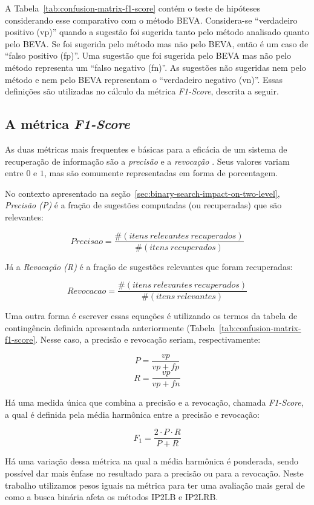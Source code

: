 A Tabela~\ref{tab:confusion-matrix-f1-score} contém o teste de hipóteses considerando esse comparativo com o método BEVA. Considera-se ``verdadeiro positivo (vp)'' quando a sugestão foi sugerida tanto pelo método analisado quanto pelo BEVA. Se foi sugerida pelo método mas não pelo BEVA, então é um caso de ``falso positivo (fp)''. Uma sugestão que foi sugerida pelo BEVA mas não pelo método representa um ``falso negativo (fn)''. As sugestões não sugeridas nem pelo método e nem pelo BEVA representam o ``verdadeiro negativo (vn)''. Essas definições são utilizadas no cálculo da métrica \textit{F1-Score}, descrita a seguir.


\subsection{A métrica \textit{F1-Score}}

As duas métricas mais frequentes e básicas para a eficácia de um sistema de recuperação de informação são a \textit{precisão} e a \textit{revocação}  \citep{irbookchristopher}. Seus valores variam entre $0$ e $1$, mas são comumente representadas em forma de porcentagem.

No contexto apresentado na seção~\ref{sec:binary-search-impact-on-two-level}, \textit{Precisão (P)} é a fração de sugestões computadas (ou recuperadas) que são relevantes:

$$ Precisao = \frac{\#(itens\ relevantes\ recuperados)}{\#(itens\ recuperados)}$$

Já a \textit{Revocação (R)} é a fração de sugestões relevantes que foram recuperadas:

$$ Revocacao = \frac{\#(itens\ relevantes\ recuperados)}{\#(itens\ relevantes)}$$

Uma outra forma é escrever essas equações é utilizando os termos da tabela de contingência definida apresentada anteriormente (Tabela~\ref{tab:confusion-matrix-f1-score}. Nesse caso, a precisão e revocação seriam, respectivamente:

$$P = \frac{vp}{vp + fp}$$
$$R = \frac{vp}{vp + fn}$$

Há uma medida única que combina a precisão e a revocação, chamada \textit{F1-Score}, a qual é definida pela média harmônica entre a precisão e revocação:

$$F_{1} = \frac{2 \cdot P \cdot R}{P + R}$$

Há uma variação dessa métrica na qual a média harmônica é ponderada, sendo possível dar mais ênfase no resultado para a precisão ou para a revocação. Neste trabalho utilizamos pesos iguais na métrica para ter uma avaliação mais geral de como a busca binária afeta os métodos IP2LB e IP2LRB.

